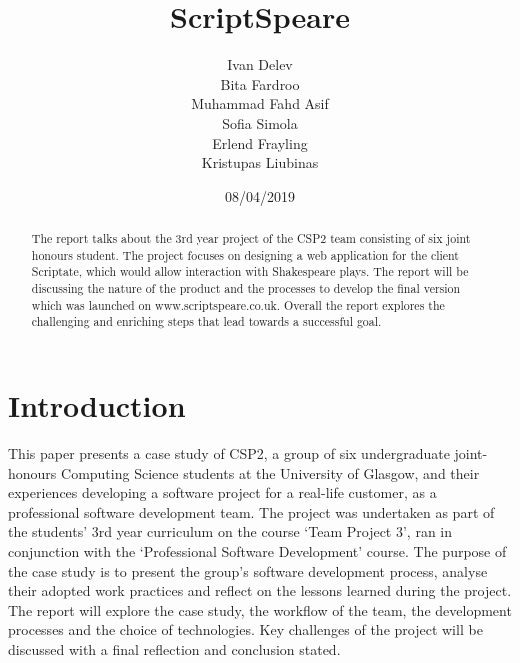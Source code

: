 \documentclass{l3proj}
\begin{document}
\title{ ScriptSpeare}

\author{Ivan Delev \\
        Bita Fardroo \\
        Muhammad Fahd Asif \\
        Sofia Simola \\
        Erlend Frayling\\
        Kristupas Liubinas \\}

\date{08/04/2019}

\maketitle

\begin{abstract}

The report talks about the 3rd year project of the CSP2 team consisting of six joint honours student. The project focuses on designing a web application for the client Scriptate, which would allow interaction with Shakespeare plays. The report will be discussing the nature of the product and the processes to develop the final version which was launched on www.scriptspeare.co.uk. Overall the report explores the challenging and enriching steps that lead towards a successful goal. 


\end{abstract}

\educationalconsent

\newpage

\section{Introduction}

This paper presents a case study of CSP2, a group of six undergraduate joint-honours Computing Science students at the University of Glasgow, and their experiences developing a software project for a real-life customer, as a professional software development team. The project was undertaken as part of the students’ 3rd year curriculum on the course ‘Team Project 3’, ran in conjunction with the ‘Professional Software Development’ course.  The purpose of the case study is to present the group’s software development process, analyse their adopted work practices and reflect on the lessons learned during the project. The report will explore the case study, the workflow of the team, the development processes and the choice of technologies. Key challenges of the project will be discussed with a final reflection and conclusion stated.
\end{document}
